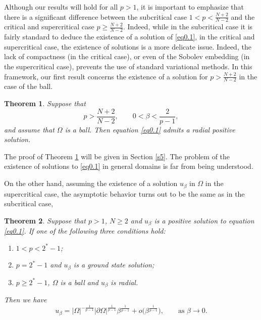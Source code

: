 \documentclass[12pt,reqno]{amsart}
\numberwithin{equation}{section}
\newtheorem{theorem}{Theorem}[section]
\theoremstyle{definition}
\begin{document}
Although our results will hold for all $p>1$, it is important to emphasize that there is a significant difference between the subcritical case $1<p<\frac{N+2}{N-2}$ and the critical and supercritical case $p\ge\frac{N+2}{N-2}$. Indeed, while in the subcritical case it is fairly standard to deduce the existence of a solution of \eqref{eq0.1}, in the critical and supercritical case, the existence of solutions is a more delicate issue. Indeed, the lack of compactness (in the critical case), or even of the Sobolev embedding (in the supercritical case), prevents the use of standard variational methods. In this framework, our first result concerns the existence of a solution for $p>\frac{N+2}{N-2}$ in the case of the ball.
\begin{theorem}\label{Theorem1.1}
Suppose that
\[
p>\frac{N+2}{N-2},\qquad 0<\beta<\frac{2}{p-1},
\]
and assume that $\Omega$ is a ball. Then equation \eqref{eq0.1} admits a radial positive solution.
\end{theorem}

The proof of Theorem \ref{Theorem1.1} will be given in Section \ref{s5}. The problem of the existence of solutions to \eqref{eq0.1} in general domains is far from being understood.

On the other hand, assuming the existence of a solution $u_\beta$ in $\Omega$ in the supercritical case, the asymptotic behavior turns out to be the same as in the subcritical case,

\begin{theorem}\label{Theorem1.4}
Suppose that $p>1$, $N\ge2$ and $u_\beta$ is a positive solution to equation \eqref{eq0.1}. 
If one of the following three conditions hold:
\begin{enumerate}
\item $1<p<2^*-1$;
\item $p=2^*-1$ and $u_\beta$ is a ground state solution;
\item $p\ge 2^*-1$, $\Omega$ is a ball and $u_\beta$ is radial.
\end{enumerate}
Then we have 
\[
u_\beta=
|\Omega|^{-\frac{1}{p-1}}|\partial\Omega|^{\frac{1}{p-1}}
\beta^{\frac{1}{p-1}}
+o\bigl(\beta^{\frac{1}{p-1}}\bigr),
\qquad \text{as }\beta\to0.
\]
\end{theorem}
\end{document}
